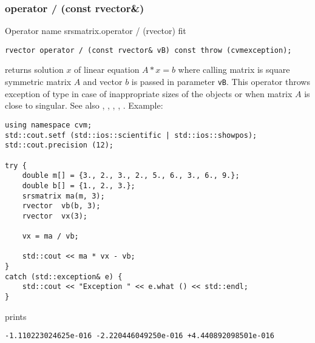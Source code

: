 \subsubsection{operator / (const rvector\&)}
Operator%
\pdfdest name {srsmatrix.operator / (rvector)} fit
\begin{verbatim}
rvector operator / (const rvector& vB) const throw (cvmexception);
\end{verbatim}
returns solution $x$ of linear equation
$A*x=b$ where calling matrix is square symmetric matrix $A$
and vector $b$ is passed in parameter \verb"vB".
This operator throws exception 
of type 
in case of inappropriate sizes
of the objects or when  matrix $A$ is close to singular.
See also , 
, 
, 
, .
Example:
\begin{Verbatim}
using namespace cvm;
std::cout.setf (std::ios::scientific | std::ios::showpos);
std::cout.precision (12);

try {
    double m[] = {3., 2., 3., 2., 5., 6., 3., 6., 9.};
    double b[] = {1., 2., 3.};
    srsmatrix ma(m, 3);
    rvector  vb(b, 3);
    rvector  vx(3);

    vx = ma / vb;

    std::cout << ma * vx - vb;
}
catch (std::exception& e) {
    std::cout << "Exception " << e.what () << std::endl;
}
\end{Verbatim}
prints
\begin{Verbatim}
-1.110223024625e-016 -2.220446049250e-016 +4.440892098501e-016
\end{Verbatim}
\newpage






